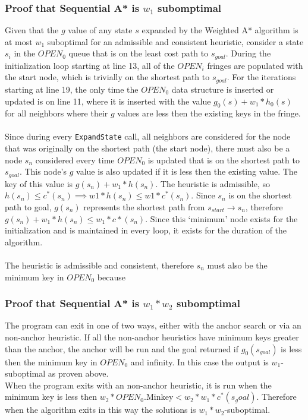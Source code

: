 \documentclass[11pt,draft]{article}
\begin{document}
\subsubsection{Proof that Sequential A* is $w_1$ subomptimal}
Given that the $g$ value of any state $s$ expanded by the Weighted A* algorithm is at most $w_1$ suboptimal for an admissible and consistent heuristic, consider a state $s_i$ in the $OPEN_0$ queue that is on the least cost path to $s_{goal}$. 
During the initialization loop starting at line 13, all of the $OPEN_i$ fringes are populated with the start node, which is trivially on the shortest path to $s_{goal}$.
For the iterations starting at line 19, the only time the $OPEN_0$ data structure is inserted or updated is on line 11, where it is inserted with the value $g_0(s) + w_1*h_0(s)$ for all neighbors where their $g$ values are less then the existing keys in the fringe.
\\\\
Since during every \verb_ExpandState_ call, all neighbors are considered for the node that was originally on the shortest path (the start node), there must also be a node $s_{n}$ considered every time $OPEN_0$ is updated that is on the shortest path to $s_{goal}$. This node's $g$ value is also updated if it is less then the existing value. The key of this value is $g(s_n) + w_1*h(s_n)$. The heuristic is admissible, so $h(s_n) \leq c^*(s_n) \implies w1*h(s_n) \leq w1*c^*(s_n)$. Since $s_{n}$ is on the shortest path to goal, $g(s_n)$ represents the shortest path from $s_{start} \rightarrow s_n$, therefore $g(s_n) + w_1*h(s_n) \leq w_1*c*(s_n)$.
Since this `minimum' node exists for the initialization and is maintained in every loop, it exists for the duration of the algorithm.
\\\\
The heuristic is admissible and consistent, therefore $s_n$ must also be the minimum key in $OPEN_0$ because 

\subsubsection{Proof that Sequential A* is $w_1*w_2$ subomptimal}
The program can exit in one of two ways, either with the anchor search or via an non-anchor heuristic.
If all the non-anchor heuristics have minimum keys greater than the anchor, the anchor will be run and the goal returned if $g_0(s_{goal})$ is less then the minimum key in $OPEN_0$ and infinity. In this case the output is $w_1$-suboptimal as proven above. \\
When the program exits with an non-anchor heuristic, it is run when the minimum key is less then $w_2*OPEN_0.\text{Minkey} < w_2*w_1*c^*(s_goal)$.
Therefore when the algorithm exits in this way the solutions is $w_1*w_2$-suboptimal.
\end{document}
